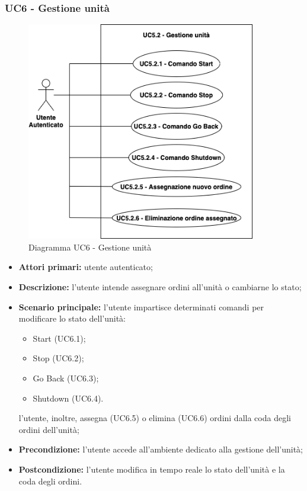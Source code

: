     \subsubsection{UC6 - Gestione unità}
    \begin{figure}[h!]
        \centering
        \includegraphics[width=10cm]{images/uc5.2.png}
        \caption{Diagramma UC6 - Gestione unità}
    \end{figure}
    \begin{itemize}
        \item \textbf{Attori primari:} utente autenticato;
        \item \textbf{Descrizione:} l'utente intende assegnare ordini all'unità o cambiarne lo stato;
        \item \textbf{Scenario principale:} l'utente impartisce determinati comandi per modificare lo stato dell'unità:
        \begin{itemize}
            \item Start (UC6.1);
            \item Stop (UC6.2);
            \item Go Back (UC6.3);
            \item Shutdown (UC6.4).
        \end{itemize}
        l'utente, inoltre, assegna (UC6.5) o elimina (UC6.6) ordini dalla coda degli ordini dell'unità;
        \item \textbf{Precondizione:} l'utente accede all'ambiente dedicato alla gestione dell'unità;
        \item \textbf{Postcondizione:} l'utente modifica in tempo reale lo stato dell'unità e la coda degli ordini.
    \end{itemize}

